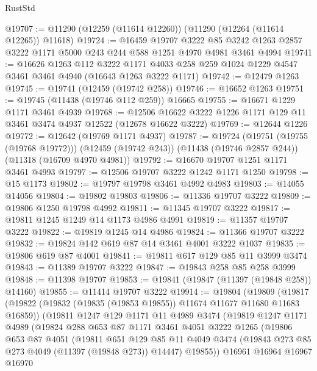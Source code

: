 \begin{lexlean}{RustStd}
\begin{coremodule}
@19707 := @11290 (@12259 (@11614 @12260)) (@11290 (@12264 (@11614 @12265)) @11618)
@19724 := @16459
    @19707
    @3222
    @85
    @3242
    @1263
    @2857
    @3222
    @1171
    @5000
    @243
    @244
    @588
    @1251
    @4970
    @4981
    @3461
    @4994
@19741 := @16626
    @1263
    @112
    @3222
    @1171
    @4033
    @258
    @259
    @1024
    @1229
    @4547
    @3461
    @3461
    @4940
    (@16643 @1263 @3222 @1171)
@19742 := @12479 @1263
@19745 := @19741 (@12459 (@19742 @258))
@19746 := @16652 @1263
@19751 := @19745 (@11438 (@19746 @112 @259)) @16665
@19755 := @16671 @1229 @1171 @3461 @4939
@19768 := @12506 @16622 @3222 @1226 @1171 @129 @11 @3461 @3474 @4937 @12522 (@12678 @16622 @3222)
@19769 := @12644 @1226
@19772 := @12642 (@19769 @1171 @4937)
@19787 := @19724
    (@19751 (@19755 (@19768 @19772)))
    (@12459 (@19742 @243))
    (@11438 (@19746 @2857 @244))
    (@11318 (@16709 @4970 @4981))
@19792 := @16670 @19707 @1251 @1171 @3461 @4993
@19797 := @12506 @19707 @3222 @1242 @1171 @1250
@19798 := @15 @1173
@19802 := @19797 @19798 @3461 @4992 @4983
@19803 := @14055 @14056
@19804 := @19802 @19803
@19806 := @11336 @19707 @3222
@19809 := @19806 @1250 @19798 @4992
@19811 := @11345 @19707 @3222
@19817 := @19811 @1245 @1249 @14 @1173 @4986 @4991
@19819 := @11357 @19707 @3222
@19822 := @19819 @1245 @14 @4986
@19824 := @11366 @19707 @3222
@19832 := @19824 @142 @619 @87 @14 @3461 @4001 @3222 @1037
@19835 := @19806 @619 @87 @4001
@19841 := @19811 @617 @129 @85 @11 @3999 @3474
@19843 := @11389 @19707 @3222
@19847 := @19843 @258 @85 @258 @3999
@19848 := @11398 @19707
@19853 := @19841 (@19847 (@11397 (@19848 @258)) @14160)
@19855 := @11414 @19707 @3222
@19914 := @19804
    (@19809
      (@19817
        (@19822 (@19832 (@19835 (@19853 @19855)) @11674 @11677 @11680 @11683 @16859))
        (@19811
          @1247
          @129
          @1171
          @11
          @4989
          @3474
          (@19819
            @1247
            @1171
            @4989
            (@19824
              @288
              @653
              @87
              @1171
              @3461
              @4051
              @3222
              @1265
              (@19806
                @653
                @87
                @4051
                (@19811
                  @651
                  @129
                  @85
                  @11
                  @4049
                  @3474
                  (@19843 @273 @85 @273 @4049 (@11397 (@19848 @273)) @14447)
                  @19855))
              @16961
              @16964
              @16967
              @16970

\end{coremodule}
\end{lexlean}
